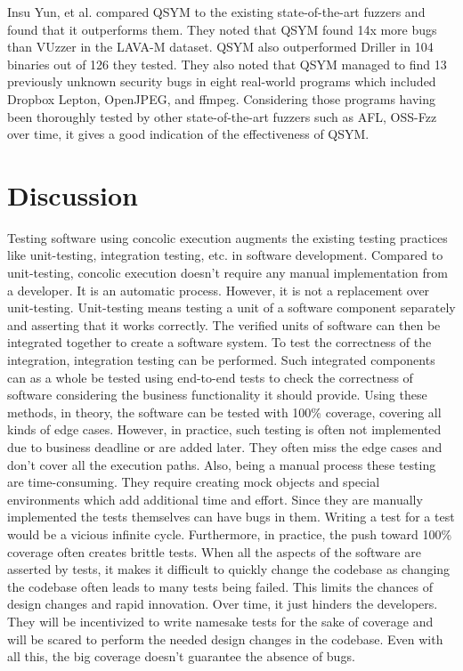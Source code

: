 \documentclass[ runningheads,
               a4paper]{llncs}
\begin{document}
Insu Yun, et al. compared QSYM \cite{yun2018qsym} to the existing state-of-the-art fuzzers and found that it outperforms them. They noted that QSYM found 14x more bugs than VUzzer in the LAVA-M dataset. QSYM also outperformed Driller in 104 binaries out of 126 they tested. They also noted that QSYM managed to find 13 previously unknown security bugs in eight real-world programs which included Dropbox Lepton, OpenJPEG, and ffmpeg. Considering those programs having been thoroughly tested by other state-of-the-art fuzzers such as AFL, OSS-Fzz over time, it gives a good indication of the effectiveness of QSYM.






\section{Discussion}


Testing software using concolic execution augments the existing testing practices like unit-testing, integration testing, etc. in software development. Compared to unit-testing, concolic execution doesn't require any manual implementation from a developer. It is an automatic process. However, it is not a replacement over unit-testing. Unit-testing means testing a unit of a software component separately and asserting that it works correctly. The verified units of software can then be integrated together to create a software system. To test the correctness of the integration, integration testing can be performed. Such integrated components can as a whole be tested using end-to-end tests to check the correctness of software considering the business functionality it should provide. Using these methods, in theory, the software can be tested with 100\% coverage, covering all kinds of edge cases. However, in practice, such testing is often not implemented due to business deadline or are added later. They often miss the edge cases and don't cover all the execution paths.  Also, being a manual process these testing are time-consuming. They require creating mock objects and special environments which add additional time and effort. Since they are manually implemented the tests themselves can have bugs in them. Writing a test for a test would be a vicious infinite cycle. Furthermore, in practice, the push toward 100\% coverage often creates brittle tests. When all the aspects of the software are asserted by tests, it makes it difficult to quickly change the codebase as changing the codebase often leads to many tests being failed. This limits the chances of design changes and rapid innovation. Over time, it just hinders the developers. They will be incentivized to write namesake tests for the sake of coverage and will be scared to perform the needed design changes in the codebase. Even with all this, the big coverage doesn't guarantee the absence of bugs.
\end{document}
